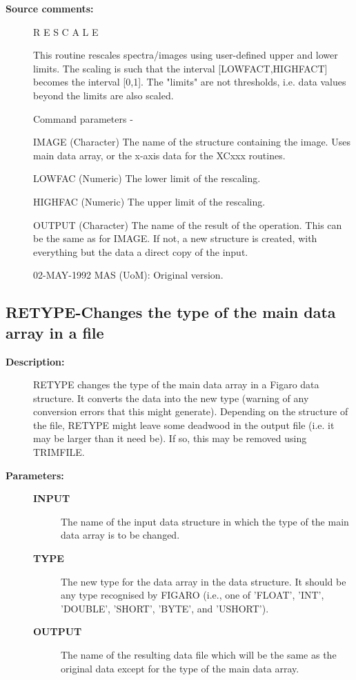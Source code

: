 \begin{description}
\begin{description}
\item [\textbf{Source comments:}]
\begin{terminalv}
 R E S C A L E

 This routine rescales spectra/images using user-defined upper and
 lower limits. The scaling is such that the interval
 [LOWFACT,HIGHFACT] becomes the interval [0,1]. The "limits" are
 not thresholds, i.e. data values beyond the limits are also
 scaled.

 Command parameters -

 IMAGE  (Character) The name of the structure containing the image.
        Uses main data array, or the x-axis data for the XCxxx routines.

 LOWFAC (Numeric) The lower limit of the rescaling.

 HIGHFAC (Numeric) The upper limit of the rescaling.

 OUTPUT (Character) The name of the result of the operation.  This
        can be the same as for IMAGE.  If not, a new structure
        is created, with everything but the data a direct
        copy of the input.

 02-MAY-1992  MAS (UoM): Original version.
\end{terminalv}
\end{description}
\subsection{RETYPE-\label{RETYPE}Changes the type of the main data array in a file}
\begin{description}

\item [\textbf{Description:}]
 RETYPE changes the type of the main data array in a Figaro data
 structure.  It converts the data into the new type (warning of
 any conversion errors that this might generate).  Depending on
 the structure of the file, RETYPE might leave some deadwood in
 the output file (i.e. it may be larger than it need be).  If so,
 this may be removed using TRIMFILE.

\item [\textbf{Parameters:}]
\begin{description}
\item [\textbf{INPUT}]
 The name of the input data structure in which the
 type of the main data array is to be changed.
\item [\textbf{TYPE}]
 The new type for the data array in the data structure.
 It should be any type recognised by FIGARO (i.e., one
 of 'FLOAT', 'INT', 'DOUBLE', 'SHORT', 'BYTE', and
 'USHORT').
\item [\textbf{OUTPUT}]
 The name of the resulting data file which will
 be the same as the original data except for the
 type of the main data array.
\end{description}


\end{description}
\end{description}
